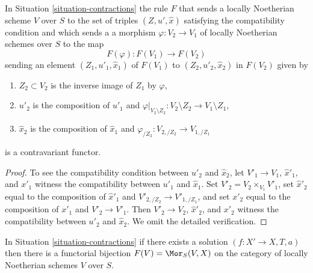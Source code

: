 \begin{lemma}
\label{lemma-functor}
In Situation \ref{situation-contractions} the rule $F$ that sends
a locally Noetherian scheme $V$ over $S$ to the set of triples
$(Z, u', \hat x)$ satisfying the compatibility condition and which sends a
a morphism $\varphi : V_2 \to V_1$ of locally Noetherian schemes over $S$
to the map
$$
F(\varphi) : F(V_1) \longrightarrow F(V_2)
$$
sending an element $(Z_1, u'_1, \hat x_1)$ of $F(V_1)$ to
$(Z_2, u'_2, \hat x_2)$ in $F(V_2)$ given by
\begin{enumerate}
\item $Z_2 \subset V_2$ is the inverse image of $Z_1$ by $\varphi$,
\item $u'_2$ is the composition of $u'_1$ and
$\varphi|_{V_2 \setminus Z_2} : V_2 \setminus Z_2 \to V_1 \setminus Z_1$,
\item $\hat x_2$ is the composition of $\hat x_1$ and
$\varphi_{/Z_2} : V_{2, /Z_2} \to V_{1, /Z_1}$
\end{enumerate}
is a contravariant functor.
\end{lemma}

\begin{proof}
To see the compatibility condition between $u'_2$ and $\hat x_2$, let
$V'_1 \to V_1$, $\hat x'_1$, and $x'_1$ witness the compatibility between
$u'_1$ and $\hat x_1$. Set $V'_2 = V_2 \times_{V_1} V'_1$, set
$\hat x'_2$ equal to the composition of $\hat x'_1$ and
$V'_{2, /Z_2} \to V'_{1, /Z_1}$, and set $x'_2$
equal to the composition of $x'_1$ and $V'_2 \to V'_1$.
Then $V'_2 \to V_2$, $\hat x'_2$, and $x'_2$ witness the compatibility between
$u'_2$ and $\hat x_2$. We omit the detailed verification.
\end{proof}

\begin{lemma}
\label{lemma-solution}
In Situation \ref{situation-contractions} if there exists a solution
$(f : X' \to X, T, a)$ then there is a functorial bijection
$F(V) = \Mor_S(V, X)$ on the category of
locally Noetherian schemes $V$ over $S$.
\end{lemma}

